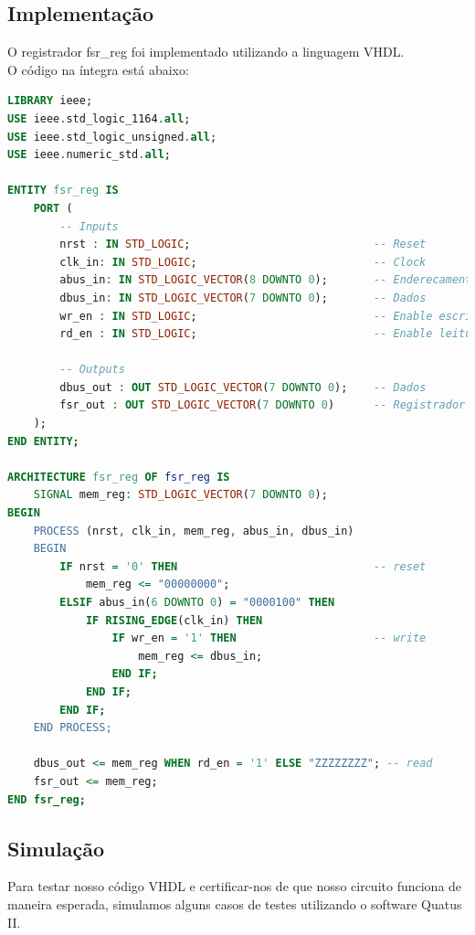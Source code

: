 \documentclass{article}
\begin{document}
\subsection{Implementação}

O registrador fsr\_reg foi implementado utilizando a linguagem VHDL.\\

O código na íntegra está abaixo:\\

\begin{lstlisting}[language=VHDL, caption={Código VHDL fsr\_reg}]
LIBRARY ieee;
USE ieee.std_logic_1164.all;
USE ieee.std_logic_unsigned.all;
USE ieee.numeric_std.all;

ENTITY fsr_reg IS
    PORT (
        -- Inputs
        nrst : IN STD_LOGIC;                            -- Reset
        clk_in: IN STD_LOGIC;                           -- Clock
        abus_in: IN STD_LOGIC_VECTOR(8 DOWNTO 0);       -- Enderecamento
        dbus_in: IN STD_LOGIC_VECTOR(7 DOWNTO 0);       -- Dados
        wr_en : IN STD_LOGIC;                           -- Enable escrita
        rd_en : IN STD_LOGIC;                           -- Enable leitura

        -- Outputs
        dbus_out : OUT STD_LOGIC_VECTOR(7 DOWNTO 0);    -- Dados
        fsr_out : OUT STD_LOGIC_VECTOR(7 DOWNTO 0)      -- Registrador
    );
END ENTITY;

ARCHITECTURE fsr_reg OF fsr_reg IS
    SIGNAL mem_reg: STD_LOGIC_VECTOR(7 DOWNTO 0);
BEGIN
    PROCESS (nrst, clk_in, mem_reg, abus_in, dbus_in)
    BEGIN
        IF nrst = '0' THEN                              -- reset
            mem_reg <= "00000000";
        ELSIF abus_in(6 DOWNTO 0) = "0000100" THEN
            IF RISING_EDGE(clk_in) THEN
                IF wr_en = '1' THEN                     -- write
                    mem_reg <= dbus_in;
                END IF;
            END IF;
        END IF;
    END PROCESS;

    dbus_out <= mem_reg WHEN rd_en = '1' ELSE "ZZZZZZZZ"; -- read
    fsr_out <= mem_reg;
END fsr_reg;    
\end{lstlisting}

\subsection{Simulação}

Para testar nosso código VHDL e certificar-nos de que nosso circuito funciona de maneira esperada, simulamos alguns casos de testes utilizando o software Quatus II.\\
\end{document}
